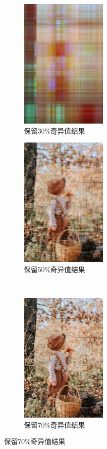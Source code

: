 \documentclass{ctexrep}
\begin{document}
\begin{figure}[h]
\centering
\begin{subfigure}{.5\textwidth}
	\centering
	\includegraphics[width=120pt]{figures/boy30.jpg}
	\caption{保留30\%奇异值结果}
	\label{fig:boy3}
\end{subfigure}%
\begin{subfigure}{.5\textwidth}
    \centering
	\includegraphics[width=120pt]{figures/boy50.jpg}
	\caption{保留50\%奇异值结果}
	\label{fig:boy5}
\end{subfigure}\\
\begin{subfigure}{.5\textwidth}
	\centering
	\includegraphics[width=120pt]{figures/boy70.jpg}
	\caption{保留70\%奇异值结果}

\end{subfigure}
\end{figure}
\end{document}
